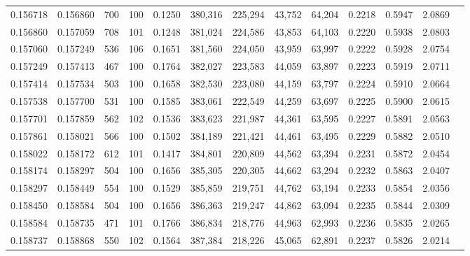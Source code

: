 \begin{tabular}{rrrrrrrrrrrrr}
0.156718 & 0.156860 &   700 & 100 &                                     0.1250 & 380,316 & 225,294 &  43,752 &  64,204 & 0.2218 & 0.5947 & 2.0869 \\
0.156860 & 0.157059 &   708 & 101 &                                     0.1248 & 381,024 & 224,586 &  43,853 &  64,103 & 0.2220 & 0.5938 & 2.0803 \\
0.157060 & 0.157249 &   536 & 106 &                                     0.1651 & 381,560 & 224,050 &  43,959 &  63,997 & 0.2222 & 0.5928 & 2.0754 \\
0.157249 & 0.157413 &   467 & 100 &                                     0.1764 & 382,027 & 223,583 &  44,059 &  63,897 & 0.2223 & 0.5919 & 2.0711 \\
0.157414 & 0.157534 &   503 & 100 &                                     0.1658 & 382,530 & 223,080 &  44,159 &  63,797 & 0.2224 & 0.5910 & 2.0664 \\
0.157538 & 0.157700 &   531 & 100 &                                     0.1585 & 383,061 & 222,549 &  44,259 &  63,697 & 0.2225 & 0.5900 & 2.0615 \\
0.157701 & 0.157859 &   562 & 102 &                                     0.1536 & 383,623 & 221,987 &  44,361 &  63,595 & 0.2227 & 0.5891 & 2.0563 \\
0.157861 & 0.158021 &   566 & 100 &                                     0.1502 & 384,189 & 221,421 &  44,461 &  63,495 & 0.2229 & 0.5882 & 2.0510 \\
0.158022 & 0.158172 &   612 & 101 &                                     0.1417 & 384,801 & 220,809 &  44,562 &  63,394 & 0.2231 & 0.5872 & 2.0454 \\
0.158174 & 0.158297 &   504 & 100 &                                     0.1656 & 385,305 & 220,305 &  44,662 &  63,294 & 0.2232 & 0.5863 & 2.0407 \\
0.158297 & 0.158449 &   554 & 100 &                                     0.1529 & 385,859 & 219,751 &  44,762 &  63,194 & 0.2233 & 0.5854 & 2.0356 \\
0.158450 & 0.158584 &   504 & 100 &                                     0.1656 & 386,363 & 219,247 &  44,862 &  63,094 & 0.2235 & 0.5844 & 2.0309 \\
0.158584 & 0.158735 &   471 & 101 &                                     0.1766 & 386,834 & 218,776 &  44,963 &  62,993 & 0.2236 & 0.5835 & 2.0265 \\
0.158737 & 0.158868 &   550 & 102 &                                     0.1564 & 387,384 & 218,226 &  45,065 &  62,891 & 0.2237 & 0.5826 & 2.0214 \\

\end{tabular}
